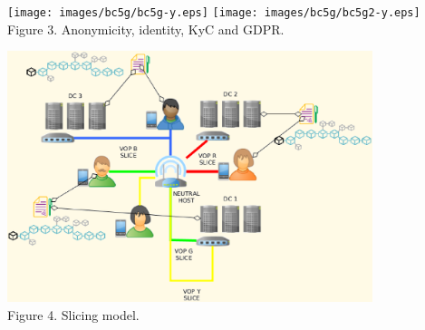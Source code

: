 \documentclass[12pt]{amsart}
\begin{document}
\begin{center}
  \texttt{[image: images/bc5g/bc5g-y.eps]}
  \texttt{[image: images/bc5g/bc5g2-y.eps]}
\\
Figure 3. Anonymicity, identity, KyC and GDPR.
\\
\end{center}
\begin{multicols}{2}

\end{multicols}
\begin{center}
  \includegraphics[keepaspectratio, width=0.8\textwidth]{images/bc5g/slices-y.eps}
\\
Figure 4. Slicing model.
\\
\end{center}
\begin{multicols}{2}


\end{multicols}
\end{document}

